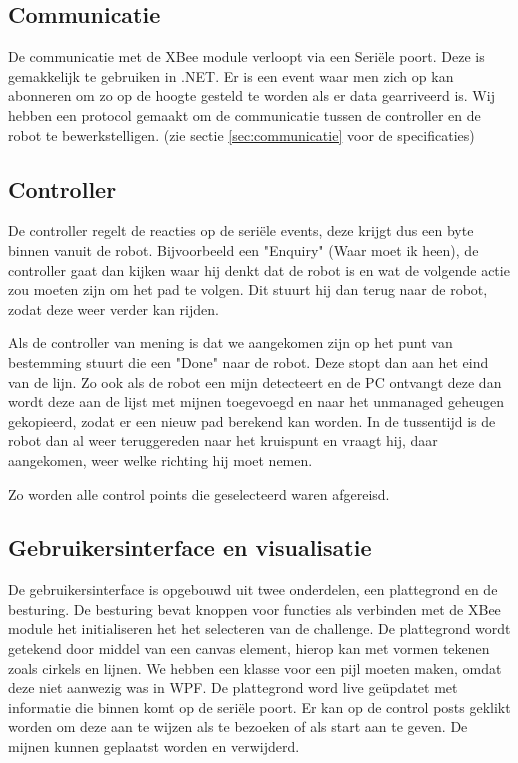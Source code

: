 \documentclass{report}
\begin{document}
\subsection{Communicatie}
De communicatie met de XBee module verloopt via een Seriële poort. Deze is gemakkelijk te gebruiken in .NET. Er is een event waar men zich op kan abonneren om zo op de hoogte gesteld te worden als er data gearriveerd is. Wij hebben een protocol gemaakt om de communicatie tussen de controller en de robot te bewerkstelligen. (zie sectie \ref{sec:communicatie} voor de specificaties)

\subsection{Controller}
De controller regelt de reacties op de seriële events, deze krijgt dus een byte binnen vanuit de robot. Bijvoorbeeld een "Enquiry" (Waar moet ik heen), de controller gaat dan kijken waar hij denkt dat de robot is en wat de volgende actie zou moeten zijn om het pad te volgen.
Dit stuurt hij dan terug naar de robot, zodat deze weer verder kan rijden.

Als de controller van mening is dat we aangekomen zijn op het punt van bestemming stuurt die een "Done" naar de robot. Deze stopt dan aan het eind van de lijn.
Zo ook als de robot een mijn detecteert en de PC ontvangt deze dan wordt deze aan de lijst met mijnen toegevoegd en naar het unmanaged geheugen gekopieerd, zodat er een nieuw pad berekend kan worden.
In de tussentijd is de robot dan al weer teruggereden naar het kruispunt en vraagt hij, daar aangekomen, weer welke richting hij moet nemen.

Zo worden alle control points die geselecteerd waren afgereisd.

\subsection{Gebruikersinterface en visualisatie}
De gebruikersinterface is opgebouwd uit twee onderdelen, een plattegrond en de besturing.
De besturing bevat knoppen voor functies als verbinden met de XBee module het initialiseren het het selecteren van de challenge.
De plattegrond wordt getekend door middel van een canvas element, hierop kan met vormen tekenen zoals cirkels en lijnen. We hebben een klasse voor een pijl moeten maken, omdat deze niet aanwezig was in WPF.
De plattegrond word live geüpdatet met informatie die binnen komt op de seriële poort.
Er kan op de control posts geklikt worden om deze aan te wijzen als te bezoeken of als start aan te geven.
De mijnen kunnen geplaatst worden en verwijderd.
\end{document}
